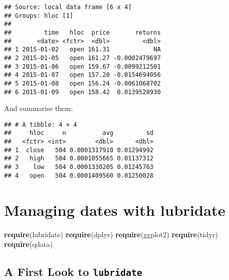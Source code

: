 \documentclass[]{book}
\newenvironment{Shaded}{\begin{snugshade}}{\end{snugshade}}
\newcommand{\KeywordTok}[1]{\textcolor[rgb]{0.13,0.29,0.53}{\textbf{{#1}}}}
\newcommand{\DataTypeTok}[1]{\textcolor[rgb]{0.13,0.29,0.53}{{#1}}}
\newcommand{\StringTok}[1]{\textcolor[rgb]{0.31,0.60,0.02}{{#1}}}
\newcommand{\OtherTok}[1]{\textcolor[rgb]{0.56,0.35,0.01}{{#1}}}
\newcommand{\NormalTok}[1]{{#1}}
\begin{document}
\begin{verbatim}
## Source: local data frame [6 x 4]
## Groups: hloc [1]
## 
##         time   hloc  price       returns
##       <date> <fctr>  <dbl>         <dbl>
## 1 2015-01-02   open 161.31            NA
## 2 2015-01-05   open 161.27 -0.0002479697
## 3 2015-01-06   open 159.67 -0.0099212501
## 4 2015-01-07   open 157.20 -0.0154694056
## 5 2015-01-08   open 156.24 -0.0061068702
## 6 2015-01-09   open 158.42  0.0139528930
\end{verbatim}

And summarise them:

\begin{Shaded}
\end{Shaded}

\begin{verbatim}
## # A tibble: 4 × 4
##     hloc     n          avg         sd
##   <fctr> <int>        <dbl>      <dbl>
## 1  close   504 0.0001317910 0.01294992
## 2   high   504 0.0001055665 0.01137312
## 3    low   504 0.0001330205 0.01245763
## 4   open   504 0.0001409560 0.01250028
\end{verbatim}

\chapter{Managing dates with
lubridate}\label{managing-dates-with-lubridate}

\begin{Shaded}
\begin{Highlighting}[]
\KeywordTok{require}\NormalTok{(lubridate)}
\KeywordTok{require}\NormalTok{(dplyr)}
\KeywordTok{require}\NormalTok{(ggplot2)}
\KeywordTok{require}\NormalTok{(tidyr)}
\KeywordTok{require}\NormalTok{(qdata)}
\end{Highlighting}
\end{Shaded}

\section{\texorpdfstring{A First Look to
\texttt{lubridate}}{A First Look to lubridate}}\label{a-first-look-to-lubridate}
\end{document}
